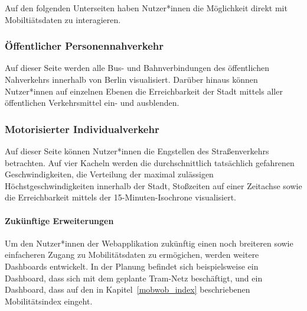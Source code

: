 Auf den folgenden Unterseiten haben Nutzer*innen die Möglichkeit direkt mit Mobiltiätsdaten zu interagieren.

\subsubsection{Öffentlicher Personennahverkehr}

Auf dieser Seite werden alle Bus- und Bahnverbindungen des öffentlichen Nahverkehrs innerhalb von Berlin visualisiert. Darüber hinaus können Nutzer*innen auf einzelnen Ebenen die Erreichbarkeit der Stadt mittels aller öffentlichen Verkehrsmittel ein- und ausblenden.


\subsubsection{Motorisierter Individualverkehr}

Auf dieser Seite können Nutzer*innen die Engstellen des Straßenverkehrs betrachten. Auf vier Kacheln werden die durchschnittlich tatsächlich gefahrenen Geschwindigkeiten, die Verteilung der maximal zulässigen Höchstgeschwindigkeiten innerhalb der Stadt, Stoßzeiten auf einer Zeitachse sowie die Erreichbarkeit mittels der 15-Minuten-Isochrone visualisiert.

\paragraph{Zukünftige Erweiterungen}

Um den Nutzer*innen der Webapplikation zukünftig einen noch breiteren sowie einfacheren Zugang zu Mobilitätsdaten zu ermögichen, werden weitere Dashboards entwickelt. In der Planung befindet sich beispielsweise ein Dashboard, dass sich mit dem geplante Tram-Netz beschäftigt, und ein Dashboard, dass auf den in Kapitel~\ref{mobwob_index} beschriebenen Mobilitätsindex eingeht.
